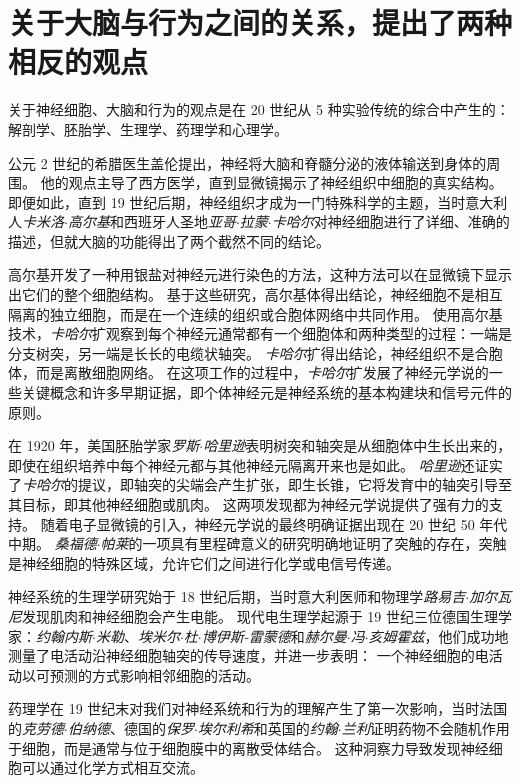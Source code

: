 \section{关于大脑与行为之间的关系，提出了两种相反的观点}

关于神经细胞、大脑和行为的观点是在 20 世纪从 5 种实验传统的综合中产生的：解剖学、胚胎学、生理学、药理学和心理学。


公元 2 世纪的希腊医生盖伦提出，神经将大脑和脊髓分泌的液体输送到身体的周围。
他的观点主导了西方医学，直到显微镜揭示了神经组织中细胞的真实结构。
即便如此，直到 19 世纪后期，神经组织才成为一门特殊科学的主题，当时意大利人\textit{卡米洛$\cdot$高尔基}和西班牙人圣地\textit{亚哥$\cdot$拉蒙$\cdot$卡哈尔}对神经细胞进行了详细、准确的描述，但就大脑的功能得出了两个截然不同的结论。


高尔基开发了一种用银盐对神经元进行染色的方法，这种方法可以在显微镜下显示出它们的整个细胞结构。
基于这些研究，高尔基体得出结论，神经细胞不是相互隔离的独立细胞，而是在一个连续的组织或合胞体网络中共同作用。
使用高尔基技术，\textit{卡哈尔}扩观察到每个神经元通常都有一个细胞体和两种类型的过程：一端是分支树突，另一端是长长的电缆状轴突。 
\textit{卡哈尔}扩得出结论，神经组织不是合胞体，而是离散细胞网络。
在这项工作的过程中，\textit{卡哈尔}扩发展了神经元学说的一些关键概念和许多早期证据，即个体神经元是神经系统的基本构建块和信号元件的原则。


在 1920 年，美国胚胎学家\textit{罗斯$\cdot$哈里逊}表明树突和轴突是从细胞体中生长出来的，即使在组织培养中每个神经元都与其他神经元隔离开来也是如此。
\textit{哈里逊}还证实了\textit{卡哈尔}的提议，即轴突的尖端会产生扩张，即生长锥，它将发育中的轴突引导至其目标，即其他神经细胞或肌肉。
这两项发现都为神经元学说提供了强有力的支持。
随着电子显微镜的引入，神经元学说的最终明确证据出现在 20 世纪 50 年代中期。
\textit{桑福德$\cdot$帕莱}的一项具有里程碑意义的研究明确地证明了突触的存在，突触是神经细胞的特殊区域，允许它们之间进行化学或电信号传递。


神经系统的生理学研究始于 18 世纪后期，当时意大利医师和物理学\textit{路易吉$\cdot$加尔瓦尼}发现肌肉和神经细胞会产生电能。
现代电生理学起源于 19 世纪三位德国生理学家：\textit{约翰内斯$\cdot$米勒}、\textit{埃米尔$\cdot$杜$\cdot$博伊斯-雷蒙德}和\textit{赫尔曼$\cdot$冯$\cdot$亥姆霍兹}，他们成功地测量了电活动沿神经细胞轴突的传导速度，并进一步表明：
一个神经细胞的电活动以可预测的方式影响相邻细胞的活动。


药理学在 19 世纪末对我们对神经系统和行为的理解产生了第一次影响，当时法国的\textit{克劳德$\cdot$伯纳德}、德国的\textit{保罗$\cdot$埃尔利希}和英国的\textit{约翰$\cdot$兰利}证明药物不会随机作用于细胞，而是通常与位于细胞膜中的离散受体结合。 
这种洞察力导致发现神经细胞可以通过化学方式相互交流。


